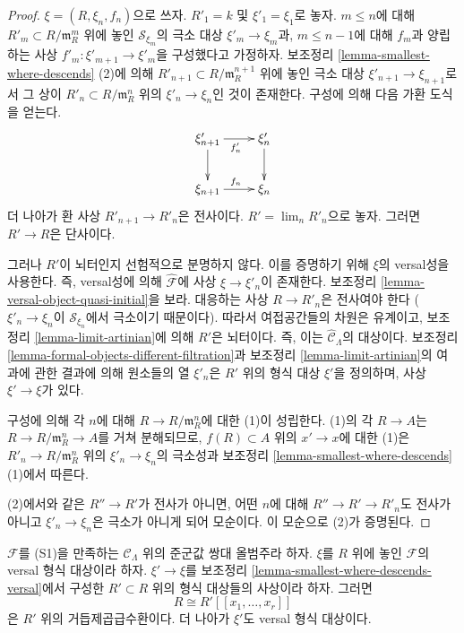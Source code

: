 \begin{proof}
$\xi = (R, \xi_n, f_n)$으로 쓰자.
$R'_1 = k$ 및 $\xi'_1 = \xi_1$로 놓자.
$m \leq n$에 대해 $R'_m \subset R/\mathfrak m_R^m$ 위에 놓인
$\mathcal{S}_{\xi_m}$의 극소 대상
$\xi'_m \to \xi_m$과, $m \leq n - 1$에 대해 $f_m$과 양립하는
사상 $f'_m : \xi'_{m + 1} \to \xi'_m$을 구성했다고 가정하자.
보조정리 \ref{lemma-smallest-where-descends} (2)에 의해
$R'_{n + 1} \subset R/\mathfrak m_R^{n + 1}$ 위에 놓인 극소 대상
$\xi'_{n + 1} \to \xi_{n + 1}$로서 그 상이
$R'_n \subset R/\mathfrak m_R^n$ 위의
$\xi'_n \to \xi_n$인 것이 존재한다.
구성에 의해 다음 가환 도식을 얻는다.
$$
\xymatrix{
\xi'_{n + 1} \ar[r]_{f'_n} \ar[d] & \xi'_n \ar[d] \\
\xi_{n + 1} \ar[r]^{f_n} & \xi_n
}
$$
더 나아가 환 사상 $R'_{n + 1} \to R'_n$은 전사이다.
$R' = \lim_n R'_n$으로 놓자. 그러면 $R' \to R$은 단사이다.

\medskip\noindent
그러나 $R'$이 뇌터인지 선험적으로 분명하지 않다.
이를 증명하기 위해 $\xi$의 versal성을 사용한다.
즉, versal성에 의해 $\widehat{\mathcal{F}}$에 사상
$\xi \to \xi'_n$이 존재한다. 보조정리
\ref{lemma-versal-object-quasi-initial}을 보라.
대응하는 사상 $R \to R'_n$은 전사여야 한다
($\xi'_n \to \xi_n$이 $\mathcal{S}_{\xi_n}$에서 극소이기 때문이다).
따라서 여접공간들의 차원은 유계이고, 보조정리
\ref{lemma-limit-artinian}에 의해 $R'$은 뇌터이다.
즉, 이는 $\widehat{\mathcal{C}}_\Lambda$의 대상이다.
보조정리 \ref{lemma-formal-objects-different-filtration}과
보조정리 \ref{lemma-limit-artinian}의 여과에 관한 결과에 의해
원소들의 열 $\xi'_n$은 $R'$ 위의 형식 대상 $\xi'$을 정의하며,
사상 $\xi' \to \xi$가 있다.

\medskip\noindent
구성에 의해 각 $n$에 대해 $R \to R/\mathfrak m_R^n$에 대한
(1)이 성립한다. (1)의 각 $R \to A$는
$R \to R/\mathfrak m_R^n \to A$를 거쳐 분해되므로,
$f(R) \subset A$ 위의 $x' \to x$에 대한 (1)은
$R'_n \to R/\mathfrak m_R^n$ 위의
$\xi'_n \to \xi_n$의 극소성과 보조정리
\ref{lemma-smallest-where-descends} (1)에서 따른다.

\medskip\noindent
(2)에서와 같은 $R'' \to R'$가 전사가 아니면, 어떤 $n$에 대해
$R'' \to R' \to R'_n$도 전사가 아니고
$\xi'_n \to \xi_n$은 극소가 아니게 되어 모순이다.
이 모순으로 (2)가 증명된다.
\end{proof}

\begin{lemma}
\label{lemma-descends-versal}
$\mathcal{F}$를 (S1)을 만족하는
$\mathcal{C}_\Lambda$ 위의 준군값 쌍대 올범주라 하자.
$\xi$를 $R$ 위에 놓인 $\mathcal{F}$의 versal 형식 대상이라 하자.
$\xi' \to \xi$를 보조정리
\ref{lemma-smallest-where-descends-versal}에서 구성한
$R' \subset R$ 위의 형식 대상들의 사상이라 하자. 그러면
$$
R \cong R'[[x_1, \ldots, x_r]]
$$
은 $R'$ 위의 거듭제곱급수환이다.
더 나아가 $\xi'$도 versal 형식 대상이다.
\end{lemma}

